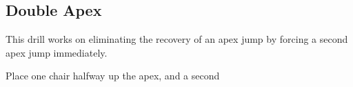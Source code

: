 \subsection{Double Apex}

This drill works on eliminating the recovery of an apex jump by forcing a second apex jump immediately.  


Place one chair halfway up the apex, and a second   
